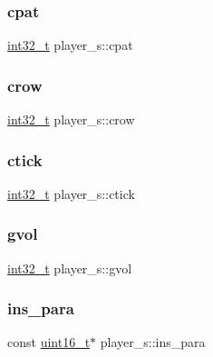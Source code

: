 \subsubsection{\texorpdfstring{cpat}{cpat}}
{\footnotesize\ttfamily \hyperlink{inttypes_8h_a32f2e37ee053cf2ce8ca28d1f74630e5}{int32\+\_\+t} player\+\_\+s\+::cpat}

\mbox{\label{structplayer__s_a096deec999caf7247e70748c5aa21f99}} 
\subsubsection{\texorpdfstring{crow}{crow}}
{\footnotesize\ttfamily \hyperlink{inttypes_8h_a32f2e37ee053cf2ce8ca28d1f74630e5}{int32\+\_\+t} player\+\_\+s\+::crow}

\mbox{\label{structplayer__s_a5b9bc2f980e16b0110b923e8d1f4eb7e}} 
\subsubsection{\texorpdfstring{ctick}{ctick}}
{\footnotesize\ttfamily \hyperlink{inttypes_8h_a32f2e37ee053cf2ce8ca28d1f74630e5}{int32\+\_\+t} player\+\_\+s\+::ctick}

\mbox{\label{structplayer__s_a83e01a5dee278d4e653d00437ae03c49}} 
\subsubsection{\texorpdfstring{gvol}{gvol}}
{\footnotesize\ttfamily \hyperlink{inttypes_8h_a32f2e37ee053cf2ce8ca28d1f74630e5}{int32\+\_\+t} player\+\_\+s\+::gvol}

\mbox{\label{structplayer__s_aa957f107f32e90b5718fb1b82630575f}} 
\subsubsection{\texorpdfstring{ins\+\_\+para}{ins\_para}}
{\footnotesize\ttfamily const \hyperlink{inttypes_8h_a273cf69d639a59973b6019625df33e30}{uint16\+\_\+t}$\ast$ player\+\_\+s\+::ins\+\_\+para}

